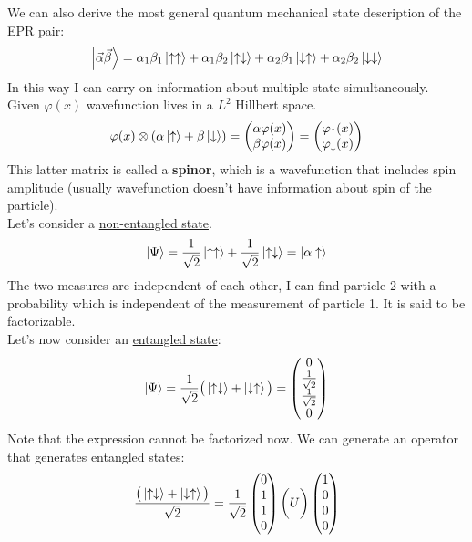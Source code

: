 We can also derive the most general quantum mechanical state description of the EPR pair:
\[
\ket{\vec{\alpha}\vec{\beta}}=\alpha_1\beta_1\ket{\uparrow\uparrow}+\alpha_1\beta_2\ket{\uparrow\downarrow}+\alpha_2\beta_1\ket{\downarrow\uparrow}+\alpha_2\beta_2\ket{\downarrow\downarrow}
\]
In this way I can carry on information about multiple state simultaneously.\\
\newline
Given $\varphi(x)$ wavefunction lives in a \emph{$L^2$} Hillbert space.\\
\[
\varphi(x)\otimes(\alpha\ket{\uparrow}+\beta\ket{\downarrow})=\begin{pmatrix}\alpha\varphi(x)\\\beta\varphi(x)\end{pmatrix}=\begin{pmatrix}\varphi_{\uparrow}(x)\\\varphi_{\downarrow}(x)\end{pmatrix}
\]
This latter matrix is called a \textbf{spinor}, which is a wavefunction that includes spin amplitude (usually wavefunction doesn't have information about spin of the particle).\\
Let's consider a \underline{non-entangled state}.
\[
\ket{\Psi}=\frac{1}{\sqrt{2}}\ket{\uparrow\uparrow}+\frac{1}{\sqrt{2}}\ket{\uparrow\downarrow}=\ket{\alpha\uparrow}
\]
The two measures are independent of each other, I can find particle 2 with a probability which is independent of the measurement of particle 1. It is said to be factorizable.\\
Let's now consider an \underline{entangled state}:
\[
\ket{\Psi}=\frac{1}{\sqrt{2}}\big(\ket{\uparrow\downarrow}+\ket{\downarrow\uparrow}\big) = \begin{pmatrix}0\\\frac{1}{\sqrt{2}}\\\frac{1}{\sqrt{2}}\\0\end{pmatrix}
\]
Note that the expression cannot be factorized now. We can generate an operator that generates entangled states:
\[
\frac{\big(\ket{\uparrow\downarrow}+\ket{\downarrow\uparrow}\big)}{\sqrt{2}}=\frac{1}{\sqrt{2}}\begin{pmatrix}0\\1\\1\\0\end{pmatrix}\bigg(U\bigg)\begin{pmatrix}1\\0\\0\\0\end{pmatrix}
\]
